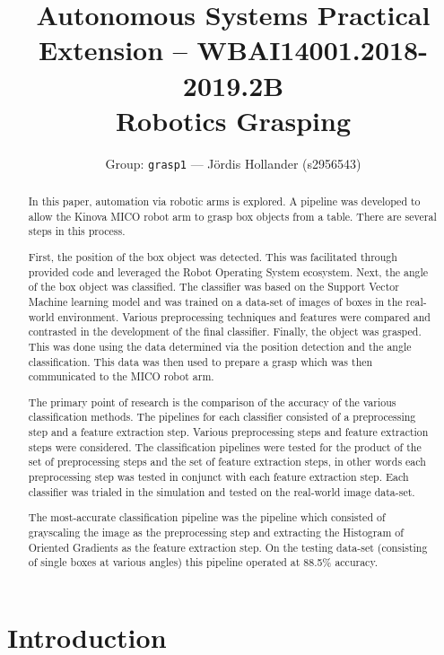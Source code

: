 \documentclass[letterpaper, 10 pt, conference]{conf/ieeeconf}  %
\title{\LARGE \bf
  Autonomous Systems Practical Extension -- WBAI14001.2018-2019.2B \\
  Robotics Grasping
}
\author{Group: \texttt{grasp1} --- J\"{o}rdis Hollander (s2956543)}
\begin{document}
\maketitle
\thispagestyle{empty}
\pagestyle{empty}


\begin{abstract}
  In this paper, automation via robotic arms is explored. A pipeline was developed
  to allow the Kinova MICO robot arm to grasp box objects from a table. There
  are several steps in this process.

  First, the position of the box object was detected. This was facilitated
  through provided code and leveraged the Robot Operating System ecosystem.
  Next, the angle of the box object was classified. The classifier was based on
  the Support Vector Machine learning model and was trained on a data-set of
  images of boxes in the real-world environment. Various preprocessing techniques
  and features were compared and contrasted in the development of the final
  classifier.
  Finally, the object was grasped. This was done using the data determined via
  the position detection and the angle classification. This data was then used to
  prepare a grasp which was then communicated to the MICO robot arm.

  The primary point of research is the comparison of the accuracy of the various
  classification methods. The pipelines for each classifier consisted of a
  preprocessing step and a feature extraction step.
  Various preprocessing steps and feature extraction steps were considered. The
  classification pipelines were tested for the product of the set of preprocessing
  steps and the set of feature extraction steps, in other words each preprocessing
  step was tested in conjunct with each feature extraction step. Each classifier
  was trialed in the simulation and tested on the real-world image data-set.

  The most-accurate classification pipeline was the pipeline which consisted of
  grayscaling the image as the preprocessing step and extracting the Histogram of
  Oriented Gradients as the feature extraction step. On the testing data-set
  (consisting of single boxes at various angles) this pipeline operated at 88.5\%
  accuracy.
\end{abstract}



\section{Introduction}
\end{document}
